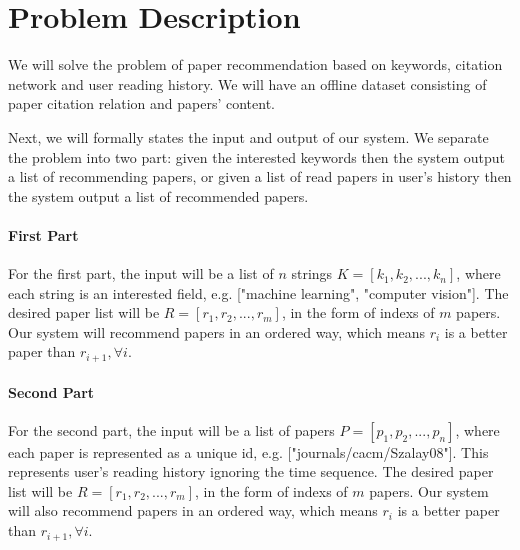 \section{Problem Description}
%
We will solve the problem of paper recommendation based on keywords, citation network and user reading history. 
We will have an offline dataset consisting of paper citation relation and papers' content.

Next, we will formally states the input and output of our system. We separate the problem into two part: given the interested keywords then the system output a list of recommending papers, or given a list of read papers in user's history then the system output a list of recommended papers. 

\paragraph{First Part}

For the first part, the input will be a list of $n$ strings $K = [k_1, k_2, ..., k_n]$, where each string is an interested field, e.g. ["machine learning", "computer vision"]. The desired paper list will be $R = [r_1, r_2, ..., r_m]$, in the form of indexs of $m$ papers. Our system will recommend papers in an ordered way, which means $r_i$ is a better paper than $r_{i+1}, \forall i$.

\paragraph{Second Part}

For the second part, the input will be a list of papers $P = [p_1, p_2, ..., p_n]$, where each paper is represented as a unique id, e.g. ["journals/cacm/Szalay08"]. This represents user's reading history ignoring the time sequence. The desired paper list will be $R =  [r_1, r_2, ..., r_m]$, in the form of indexs of $m$ papers. Our system will also recommend papers in an ordered way, which means $r_i$ is a better paper than $r_{i+1}, \forall i$.

